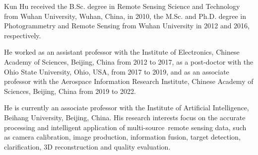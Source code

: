 \documentclass[lettersize,journal]{IEEEtran}
\begin{document}
\begin{IEEEbiography}{Kun Hu} received the B.Sc. degree in Remote Sensing Science and Technology from Wuhan University, Wuhan, China, in 2010, the M.Sc. and Ph.D. degree in Photogrammetry and Remote Sensing from Wuhan University in 2012 and 2016, respectively.

He worked as an assistant professor with the Institute of Electronics, Chinese Academy of Sciences, Beijing, China from 2012 to 2017, as a post-doctor with the Ohio State University, Ohio, USA, from 2017 to 2019, and as an associate professor with the Aerospace Information Research Institute, Chinese Academy of Sciences, Beijing, China from 2019 to 2022. 

He is currently an associate professor with the Institute of Artificial Intelligence, Beihang University, Beijing, China. His research interests focus on the accurate processing and intelligent application of multi-source remote sensing data, such as camera calibration, image production, information fusion, target detection, clarification, 3D reconstruction and quality evaluation. 

\end{IEEEbiography}



\end{document}
